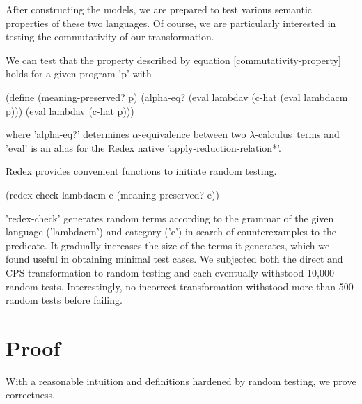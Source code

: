 \documentclass{llncs}
\newcommand{\lc}[0]{$\lambda$-calculus}
\begin{document}
After constructing the models, we are prepared to test various semantic properties of these two languages. Of course, we are particularly interested in testing the commutativity of our transformation.



We can test that the property described by equation \ref{commutativity-property} holds for a given program \scheme'p' with 
\begin{schemedisplay}
(define (meaning-preserved? p)
  (alpha-eq? (eval lambdav (c-hat (eval lambdacm p))) (eval lambdav (c-hat p)))
\end{schemedisplay}
where \scheme'alpha-eq?' determines $\alpha$-equivalence between two \lc\ terms and \scheme'eval' is an alias for the Redex native \scheme'apply-reduction-relation*'.

Redex provides convenient functions to initiate random testing.

\begin{schemedisplay}
(redex-check lambdacm e (meaning-preserved? e))
\end{schemedisplay}

\scheme'redex-check' generates random terms according to the grammar of the given language (\scheme'lambdacm') and category (\scheme'e') in search of counterexamples to the predicate. It gradually increases the size of the terms it generates, which we found useful in obtaining minimal test cases. We subjected both the direct and CPS transformation to random testing and each eventually withstood 10,000 random tests. Interestingly, no incorrect transformation withstood more than 500 random tests before failing.

\section{Proof}
\label{sec-proof}

With a reasonable intuition and definitions hardened by random testing, we prove correctness.
\end{document}
